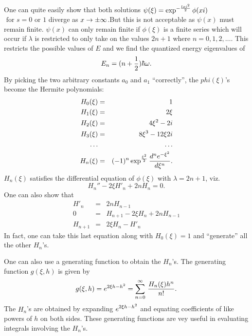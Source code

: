 One can quite easily show that both solutions $\displaystyle \psi(\xi) = \exp^{-{lxi^2\over2}}\phi(xi)$ $\mbox{ for } s=0 \mbox{ or } 1$ diverge as $x\rightarrow \pm \infty$.But this is not acceptable as $\psi(x)$ must remain finite.
$\psi(x)$ can only remain finite if $\phi(\xi)$ is a finite series which will occur if $\lambda$ is restricted to only take on the values $2n + 1$ where $n=0,1,2,\hdots$. This restricts the possible values of $E$ and we find
the quantized energy eigenvalues of $$E_n = (n + {1\over2})\hbar\omega.$$
By picking the two arbitrary constants $a_0$ and $a_1$ ``correctly'', the $phi(\xi)$'s become the Hermite polynomials:
\begin{eqnarray*}
H_0(\xi) &=& 1\\
H_1(\xi) &=& 2\xi\\
H_2(\xi) &=& 4\xi^2 - 2i\\
H_3(\xi) &=& 8\xi^3 - 12\xi2i\\
\hdots &\null& \hdots\\
H_n(\xi) &=& (-1)^n \exp^{{\xi^2\over 2}}{d^n e^{-\xi^2}\over d\xi^n}.
\end{eqnarray*}
$H_n(\xi)$ satisfies the differential equation of $\phi(\xi)$ with $\lambda = 2n+1$, viz. 
$$H_n'' - 2\xi H'_n + 2n H_n = 0.$$
One can also show that 
\begin{eqnarray*}
H'_n &=& 2n H_{n-1}\\
0 &=& H_{n+1} - 2\xi H_n + 2n H_{n-1}\\
H_{n+1} &=& 2\xi H_n - H'_n
\end{eqnarray*}
In fact, one can take this last equation along with $H_0(\xi) = 1$ and ``generate'' all the other $H_n$'s. 

One can also use a generating function to obtain the $H_n$'s. The generating function $g(\xi,h)$ is given by
$$g(\xi,h) = e^{2\xi h - h^2} = \sum_{n=0}^\infty\, {H_n(\xi)h^n\over n!}.$$
The $H_n$'s are obtained by expanding $\displaystyle e^{2\xi h - h^2}$ and equating coefficients of like powers of $h$ on both sides. These generating functions are vey useful in evaluating integrals involving the $H_n$'s. 


